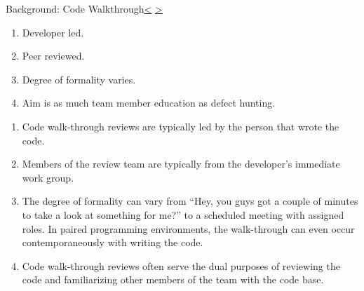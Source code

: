 \documentclass[12pt]{extarticle}
\newenvironment{instructionblock}{\Large\bgroup}{\egroup}
\begin{document}
\pagebreak
\begin{slide}{Background: Code Walkthrough}{\hyperref[slide 13]{\textless} \hyperref[slide 15]{\textgreater}}
	\vskip 10pt
	\begin{instructionblock}
	\begin{enumerate}
	\item Developer led\cite{CodeWalkthrough}.
	\item Peer reviewed\cite{CodeWalkthrough}.
	\item Degree of formality varies\cite{CodeWalkthrough}.
	\item Aim is as much team member education as defect hunting\cite{CodeWalkthrough}.
	\end{enumerate}
	
	\end{instructionblock}
\end{slide}
\begin{enumerate}
\item Code walk-through reviews are typically led by the person that wrote the code\cite{CodeWalkthrough}.
\item Members of the review team are typically from the developer's immediate work group\cite{CodeWalkthrough}.
\item The degree of formality can vary from ``Hey, you guys got a couple of minutes to take a look at something for me?'' to a scheduled meeting with assigned roles.  In paired programming environments, the walk-through can even occur contemporaneously with writing the code\cite{CodeWalkthrough}.
\item Code walk-through reviews often serve the dual purposes of reviewing the code and familiarizing other members of the team with the code base\cite{CodeWalkthrough}.
\end{enumerate}



\end{document}
